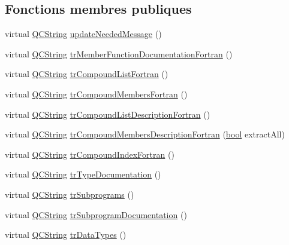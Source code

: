 \subsection*{Fonctions membres publiques}
\begin{DoxyCompactItemize}
\item 
virtual \hyperlink{class_q_c_string}{Q\+C\+String} \hyperlink{class_translator_adapter__1__5__4_a587a31dad925e47f206b6a0cda9eedd0}{update\+Needed\+Message} ()
\item 
virtual \hyperlink{class_q_c_string}{Q\+C\+String} \hyperlink{class_translator_adapter__1__5__4_a422a473020fb45b0ea0068f25180874d}{tr\+Member\+Function\+Documentation\+Fortran} ()
\item 
virtual \hyperlink{class_q_c_string}{Q\+C\+String} \hyperlink{class_translator_adapter__1__5__4_ad087e36473fb9134423020427fb5f5b2}{tr\+Compound\+List\+Fortran} ()
\item 
virtual \hyperlink{class_q_c_string}{Q\+C\+String} \hyperlink{class_translator_adapter__1__5__4_ab5ae191788a7d8b6f1ca1236dc32f106}{tr\+Compound\+Members\+Fortran} ()
\item 
virtual \hyperlink{class_q_c_string}{Q\+C\+String} \hyperlink{class_translator_adapter__1__5__4_a58ad6618c090643625238972ca0e36c6}{tr\+Compound\+List\+Description\+Fortran} ()
\item 
virtual \hyperlink{class_q_c_string}{Q\+C\+String} \hyperlink{class_translator_adapter__1__5__4_ab98b7cbeff965ae9f552dfb812e4b8d5}{tr\+Compound\+Members\+Description\+Fortran} (\hyperlink{qglobal_8h_a1062901a7428fdd9c7f180f5e01ea056}{bool} extract\+All)
\item 
virtual \hyperlink{class_q_c_string}{Q\+C\+String} \hyperlink{class_translator_adapter__1__5__4_a1aae71636ba1a8d19be7da7e4ec6493b}{tr\+Compound\+Index\+Fortran} ()
\item 
virtual \hyperlink{class_q_c_string}{Q\+C\+String} \hyperlink{class_translator_adapter__1__5__4_a5697cfc6f83b29347c2f7887f129ae81}{tr\+Type\+Documentation} ()
\item 
virtual \hyperlink{class_q_c_string}{Q\+C\+String} \hyperlink{class_translator_adapter__1__5__4_a76d7c1a008b8598eaf734f4991c78bff}{tr\+Subprograms} ()
\item 
virtual \hyperlink{class_q_c_string}{Q\+C\+String} \hyperlink{class_translator_adapter__1__5__4_a80cffd7244cd299b0926e2db7490fabc}{tr\+Subprogram\+Documentation} ()
\item 
virtual \hyperlink{class_q_c_string}{Q\+C\+String} \hyperlink{class_translator_adapter__1__5__4_aba89b913bf19d0e39e71994b506c5468}{tr\+Data\+Types} ()

\end{DoxyCompactItemize}
